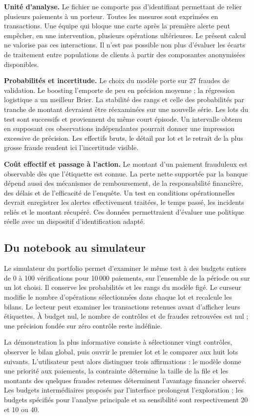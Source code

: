 \documentclass[11pt,a4paper]{article}
\begin{document}
\textbf{Unité d'analyse.} Le fichier ne comporte pas d'identifiant permettant de relier plusieurs paiements à un porteur. Toutes les mesures sont exprimées en transactions. Une équipe qui bloque une carte après la première alerte peut empêcher, en une intervention, plusieurs opérations ultérieures. Le présent calcul ne valorise pas ces interactions. Il n'est pas possible non plus d'évaluer les écarts de traitement entre populations de clients à partir des composantes anonymisées disponibles.

\textbf{Probabilités et incertitude.} Le choix du modèle porte sur 27 fraudes de validation. Le boosting l'emporte de peu en précision moyenne ; la régression logistique a un meilleur Brier. La stabilité des rangs et celle des probabilités par tranche de montant devraient être réexaminées sur une nouvelle série. Les lots du test sont successifs et proviennent du même court épisode. Un intervalle obtenu en supposant ces observations indépendantes pourrait donner une impression excessive de précision. Les effectifs bruts, le détail par lot et le retrait de la plus grosse fraude rendent ici l'incertitude visible.

\textbf{Coût effectif et passage à l'action.} Le montant d'un paiement frauduleux est observable dès que l'étiquette est connue. La perte nette supportée par la banque dépend aussi des mécanismes de remboursement, de la responsabilité financière, des délais et de l'efficacité de l'enquête. Un test en conditions opérationnelles devrait enregistrer les alertes effectivement traitées, le temps passé, les incidents reliés et le montant récupéré. Ces données permettraient d'évaluer une politique réelle avec un dispositif d'identification adapté.

\subsection{Du notebook au simulateur}
Le simulateur du portfolio permet d'examiner le même test à des budgets entiers de 0 à 100 vérifications pour 10\,000 paiements, sur l'ensemble de la période ou sur un lot choisi. Il conserve les probabilités et les rangs du modèle figé. Le curseur modifie le nombre d'opérations sélectionnées dans chaque lot et recalcule les bilans. Le lecteur peut examiner les transactions retenues avant d'afficher leurs étiquettes. À budget nul, le nombre de contrôles et de fraudes retrouvées est nul ; une précision fondée sur zéro contrôle reste indéfinie.

La démonstration la plus informative consiste à sélectionner vingt contrôles, observer le bilan global, puis ouvrir le premier lot et le comparer aux huit lots suivants. L'utilisateur peut alors distinguer trois affirmations : le modèle donne une priorité aux paiements, la contrainte détermine la taille de la file et les montants des quelques fraudes retenues déterminent l'avantage financier observé. Les budgets intermédiaires proposés par l'interface prolongent l'exploration ; les budgets spécifiés pour l'analyse principale et sa sensibilité sont respectivement 20 et 10 ou 40.
\end{document}
